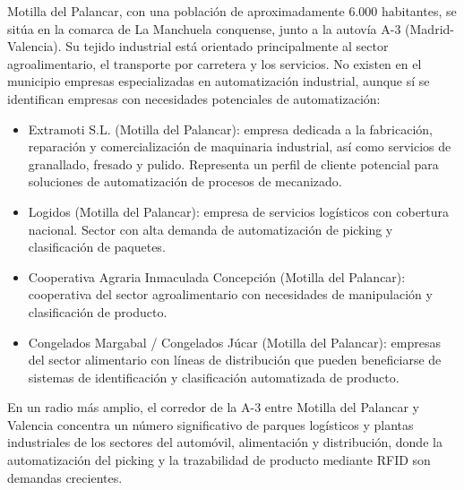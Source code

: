
Motilla del Palancar, con una población de aproximadamente 6.000 habitantes, se sitúa en la comarca de La Manchuela conquense, junto a la autovía A-3 (Madrid-Valencia). Su tejido industrial está orientado principalmente al sector agroalimentario, el transporte por carretera y los servicios. No existen en el municipio empresas especializadas en automatización industrial, aunque sí se identifican empresas con necesidades potenciales de automatización:

\begin{itemize}
	\item Extramoti S.L. (Motilla del Palancar): empresa dedicada a la fabricación, reparación y comercialización de maquinaria industrial, así como servicios de granallado, fresado y pulido. Representa un perfil de cliente potencial para soluciones de automatización de procesos de mecanizado.

	\item Logidos (Motilla del Palancar): empresa de servicios logísticos con cobertura nacional. Sector con alta demanda de automatización de picking y clasificación de paquetes.

	\item Cooperativa Agraria Inmaculada Concepción (Motilla del Palancar): cooperativa del sector agroalimentario con necesidades de manipulación y clasificación de producto.

	\item Congelados Margabal / Congelados Júcar (Motilla del Palancar): empresas del sector alimentario con líneas de distribución que pueden beneficiarse de sistemas de identificación y clasificación automatizada de producto.
\end{itemize}

En un radio más amplio, el corredor de la A-3 entre Motilla del Palancar y Valencia concentra un número significativo de parques logísticos y plantas industriales de los sectores del automóvil, alimentación y distribución, donde la automatización del picking y la trazabilidad de producto mediante RFID son demandas crecientes.
